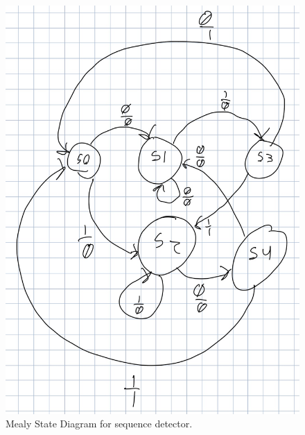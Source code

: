\documentclass[11pt]{article}
\begin{document}
\begin{center}
\begin{figure}
	\includegraphics[width=\textwidth]{images/img2.jpg}
	\caption{\label{fig:mealy_machine}Mealy State Diagram for sequence detector.}
\end{figure}
\end{center}
\end{document}
